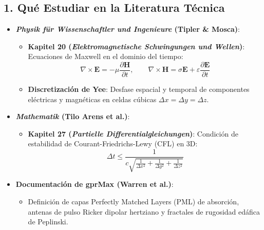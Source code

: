 \documentclass[11pt,a4paper]{article}
\begin{document}
\subsection{1. Qu{\'e} Estudiar en la Literatura T{\'e}cnica}
\begin{itemize}
    \item \textbf{\textit{Physik f{\"u}r Wissenschaftler und Ingenieure} (Tipler \& Mosca)}:
    \begin{itemize}
        \item \textbf{Kapitel 20 (\textit{Elektromagnetische Schwingungen und Wellen})}: Ecuaciones de Maxwell en el dominio del tiempo:
        \begin{equation}
            \nabla \times \mathbf{E} = -\mu \frac{\partial \mathbf{H}}{\partial t}, \qquad \nabla \times \mathbf{H} = \sigma \mathbf{E} + \varepsilon \frac{\partial \mathbf{E}}{\partial t}
        \end{equation}
        \item \textbf{Discretizaci{\'o}n de Yee}: Desfase espacial y temporal de componentes el{\'e}ctricas y magn{\'e}ticas en celdas c{\'u}bicas $\Delta x = \Delta y = \Delta z$.
    \end{itemize}
    \item \textbf{\textit{Mathematik} (Tilo Arens et al.)}:
    \begin{itemize}
        \item \textbf{Kapitel 27 (\textit{Partielle Differentialgleichungen})}: Condici{\'o}n de estabilidad de Courant-Friedrichs-Lewy (CFL) en 3D:
        \begin{equation}
            \Delta t \le \frac{1}{c \sqrt{\frac{1}{\Delta x^2} + \frac{1}{\Delta y^2} + \frac{1}{\Delta z^2}}}
        \end{equation}
    \end{itemize}
    \item \textbf{Documentaci{\'o}n de gprMax (Warren et al.)}:
    \begin{itemize}
        \item Definici{\'o}n de capas Perfectly Matched Layers (PML) de absorci{\'o}n, antenas de pulso Ricker dipolar hertziano y fractales de rugosidad ed{\'a}fica de Peplinski.
    \end{itemize}
\end{itemize}
\end{document}
